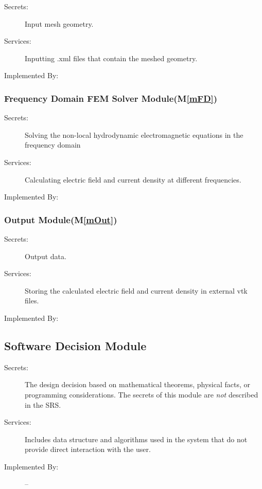\documentclass[12pt, titlepage]{article}
\newcommand{\mref}[1]{M\ref{#1}}
\begin{document}
	\begin{description} \item[Secrets:]Input mesh geometry.
		\item[Services:]Inputting .xml files that contain the meshed geometry.
		\item[Implemented By:] \progname{} \end{description}
	
	
	
	\subsubsection{Frequency Domain FEM Solver Module(\mref{mFD})}
	
	\begin{description} \item[Secrets:]Solving the non-local hydrodynamic
		electromagnetic equations in the frequency domain \item[Services:]Calculating
		electric field and current density at different frequencies. \item[Implemented
		By:] \progname{} \end{description}
	
	
	
	\subsubsection{Output Module(\mref{mOut})}
	
	\begin{description} \item[Secrets:]Output data. \item[Services:]Storing the
		calculated electric field and current density in external vtk files.
		\item[Implemented By:] \progname{} \end{description}
	
	
	\subsection{Software Decision Module}
	
	\begin{description} \item[Secrets:] The design decision based on mathematical
		theorems, physical facts, or programming considerations. The secrets of this
		module are \emph{not} described in the SRS. \item[Services:] Includes data
		structure and algorithms used in the system that do not provide direct
		interaction with the user. %
		\item[Implemented By:] -- \end{description}
	
\end{document}
